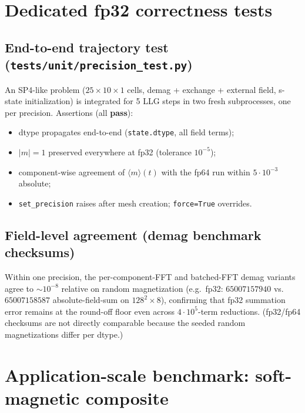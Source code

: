 \documentclass[11pt,a4paper]{article}
\newcommand{\ok}{\textcolor{green!50!black}{\textbf{pass}}}
\begin{document}
\section{Dedicated fp32 correctness tests}
\label{sec:fp32tests}

\subsection{End-to-end trajectory test (\texttt{tests/unit/precision\_test.py})}

An SP4-like problem ($25\times10\times1$ cells, demag + exchange + external
field, s-state initialization) is integrated for 5 LLG steps in two fresh
subprocesses, one per precision. Assertions (all \ok):
\begin{itemize}
\item dtype propagates end-to-end (\texttt{state.dtype}, all field terms);
\item $\lvert m\rvert = 1$ preserved everywhere at fp32 (tolerance $10^{-5}$);
\item component-wise agreement of $\langle m\rangle(t)$ with the fp64 run within
      $5\cdot10^{-3}$ absolute;
\item \texttt{set\_precision} raises after mesh creation; \texttt{force=True}
      overrides.
\end{itemize}

\subsection{Field-level agreement (demag benchmark checksums)}

Within one precision, the per-component-FFT and batched-FFT demag variants agree
to $\sim10^{-8}$ relative on random magnetization (e.g.\ fp32:
$65007157940$ vs.\ $65007158587$ absolute-field-sum on $128^2{\times}8$),
confirming that fp32 summation error remains at the round-off floor even across
$4\cdot10^{5}$-term reductions. (fp32/fp64 checksums are not directly comparable
because the seeded random magnetizations differ per dtype.)

\section{Application-scale benchmark: soft-magnetic composite}
\label{sec:composite}
\end{document}
